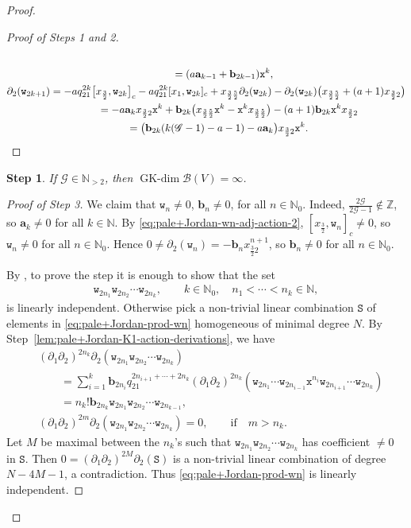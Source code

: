 \documentclass[pdftex]{sigma}
\numberwithin{equation}{section}
\newtheorem{stepiv}{Step}
\newcommand{\GK}{\operatorname{GK-dim}}
\newcommand{\toba}{\mathscr B}
\newcommand{\ghost}{\mathscr{G}}
\newcommand{\ab}{\mathbf a}
\newcommand{\bb}{\mathbf b}
\newcommand{\N}{{\mathbb N}}
\newcommand{\Z}{{\mathbb Z}}
\newcommand{\wt}{\mathtt{w}}
\newcommand{\xt}{\mathtt{x}}
\newcommand{\tresdos}{\frac{3}{2}}
\newcommand{\cincodos}{\frac{5}{2}}
\begin{document}
\begin{proof}
\begin{proof}[Proof of Steps 1 and 2]
\begin{gather*}
\\\hphantom{\partial_{2} (\wt_{2k})}
{}= (a\ab_{k-1} +\bb_{2k-1}) \xt^{k},
\\
\partial_{2} (\wt_{2k+1}) =
-aq_{21}^{2k}\big[x_{\tresdos},\wt_{2k}\big]_c
-aq_{21}^{2k}[x_1,\wt_{2k}]_c
+x_{\tresdos\cincodos}\partial_2(\wt_{2k})
-\partial_2(\wt_{2k}) \big(x_{\tresdos\cincodos}+(a+1)x_{\tresdos2}\big)
\\ \hphantom{\partial_{2} (\wt_{2k+1})}
{} = -a\ab_k x_{\tresdos2}\xt^{k}
+\bb_{2k} \big(x_{\tresdos\cincodos}\xt^{k}-\xt^{k} x_{\tresdos\cincodos}\big)
-(a+1)\bb_{2k} \xt^{k}x_{\tresdos2}
\\ \hphantom{\partial_{2} (\wt_{2k+1})}
{} = \big(\bb_{2k} (k(\ghost-1)-a-1) -a\ab_k\big) x_{\tresdos2}\xt^{k}.
\tag*{\qed}
\end{gather*}
\renewcommand{\qed}{}
\end{proof}


\begin{stepiv}\label{prop:pale+Jordan}
If $\ghost\in\N_{>2}$, then $\GK \toba(V)=\infty$.
\end{stepiv}

\begin{proof}[Proof of Step 3]
We claim that
$\wt_n \ne 0$, $\bb_n \ne 0$, for all $n\in\N_0$.
Indeed, $\tfrac{2\ghost}{2\ghost-1}\notin\Z$, so $\ab_k\ne 0$ for all $k\in\N$.
By \eqref{eq:pale+Jordan-wn-adj-action-2}, $[x_{\tresdos},\wt_n]_c\ne 0$, so $\wt_n \ne 0$ for all $n\in\N_0$. Hence
$0\ne \partial_2(\wt_n)= -\bb_n x_{\tresdos2}^{n+1}$, so $\bb_{n}\ne 0$ for all $n\in\N_0$.

By \cite[Lemma~2.3.4]{AAH-triang}, to prove the step it is enough to show that the set
\begin{align}\label{eq:pale+Jordan-prod-wn}
 \wt_{2n_1}\wt_{2n_2}\cdots \wt_{2n_k},\qquad
 k\in\mathbb N_0, \quad n_1< \cdots< n_k \in\N,
\end{align}
is linearly independent.
Otherwise pick a non-trivial linear combination $\mathtt S$ of elements in \eqref{eq:pale+Jordan-prod-wn}
homogeneous of minimal degree $N$. By Step~\ref{lem:pale+Jordan-K1-action-derivations}, we have
\begin{align*}
&(\partial_1\partial_2)^{2n_k}\partial_2 (\wt_{2n_1}\wt_{2n_2}\cdots \wt_{2n_k})
\\
&\qquad{}= \sum_{i=1}^k \bb_{2n_i}q_{21}^{2n_{i+1}+\cdots +2n_k} (\partial_1\partial_2)^{2n_k} (\wt_{2n_1}\cdots \wt_{2n_{i-1}} \xt^{n_i}\wt_{2n_{i+1}}\cdots \wt_{2n_k})
\\
&\qquad{} = n_k! \bb_{2n_k} \wt_{2n_1}\wt_{2n_2}\cdots \wt_{2n_{k-1}},
\\
&(\partial_1\partial_2)^{2m}\partial_2 (\wt_{2n_1}\wt_{2n_2}\cdots \wt_{2n_k}) =0, \qquad
\text{if}\quad m>n_k.
\end{align*}
Let $M$ be maximal between the $n_k$'s such that $\wt_{2n_1}\wt_{2n_2}\cdots \wt_{2n_k}$ has
coefficient $\neq 0$ in $\mathtt S$.
Then $0=(\partial_1\partial_2)^{2M}\partial_2(\mathtt S)$ is a non-trivial linear combination of degree $N-4M-1$,
a contradiction. Thus \eqref{eq:pale+Jordan-prod-wn} is linearly independent.
\end{proof}


\end{proof}
\end{document}
